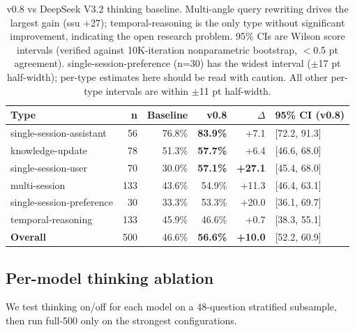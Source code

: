 \begin{table}[h]
\centering
\small
\begin{tabular}{lrrrrl}
\toprule
\textbf{Type} & \textbf{n} & \textbf{Baseline} & \textbf{v0.8} & \textbf{\(\Delta\)} & \textbf{95\% CI (v0.8)} \\
\midrule
single-session-assistant & 56 & 76.8\% & \textbf{83.9\%} & +7.1 & [72.2, 91.3] \\
knowledge-update & 78 & 51.3\% & \textbf{57.7\%} & +6.4 & [46.6, 68.0] \\
single-session-user & 70 & 30.0\% & \textbf{57.1\%} & \textbf{+27.1} & [45.4, 68.0] \\
multi-session & 133 & 43.6\% & 54.9\% & +11.3 & [46.4, 63.1] \\
single-session-preference & 30 & 33.3\% & 53.3\% & +20.0 & [36.1, 69.7] \\
temporal-reasoning & 133 & 45.9\% & 46.6\% & +0.7 & [38.3, 55.1] \\
\midrule
\textbf{Overall} & 500 & 46.6\% & \textbf{56.6\%} & \textbf{+10.0} & [52.2, 60.9] \\
\bottomrule
\end{tabular}
\caption{v0.8 vs DeepSeek V3.2 thinking baseline. Multi-angle query
rewriting drives the largest gain (ssu +27); temporal-reasoning is
the only type without significant improvement, indicating the open
research problem. 95\% CIs are Wilson score intervals (verified
against 10K-iteration nonparametric bootstrap, $<$0.5 pt agreement).
single-session-preference (n=30) has the widest interval
($\pm$17 pt half-width); per-type estimates here should be read with
caution. All other per-type intervals are within $\pm$11 pt half-width.}
\label{tab:per-type}
\end{table}

\subsection{Per-model thinking ablation}

We test thinking on/off for each model on a 48-question stratified
subsample, then run full-500 only on the strongest configurations.

